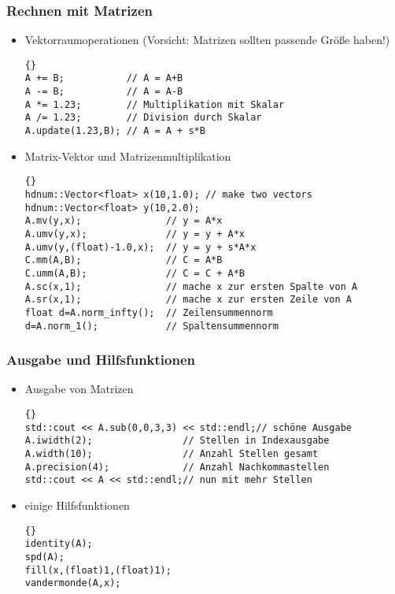 \documentclass[a4paper,11pt]{article}
\theoremstyle{definition}
\begin{document}
\begin{frame}[fragile]
\frametitle{Rechnen mit Matrizen}
\begin{itemize}
\item Vektorraumoperationen (Vorsicht: Matrizen sollten passende Größe haben!)\\
{\footnotesize{\begin{lstlisting}{}
A += B;           // A = A+B
A -= B;           // A = A-B
A *= 1.23;        // Multiplikation mit Skalar
A /= 1.23;        // Division durch Skalar
A.update(1.23,B); // A = A + s*B
\end{lstlisting}}}
\item Matrix-Vektor und Matrizenmultiplikation\\
{\footnotesize{\begin{lstlisting}{}
hdnum::Vector<float> x(10,1.0); // make two vectors
hdnum::Vector<float> y(10,2.0);
A.mv(y,x);               // y = A*x
A.umv(y,x);              // y = y + A*x
A.umv(y,(float)-1.0,x);  // y = y + s*A*x
C.mm(A,B);               // C = A*B
C.umm(A,B);              // C = C + A*B
A.sc(x,1);               // mache x zur ersten Spalte von A
A.sr(x,1);               // mache x zur ersten Zeile von A
float d=A.norm_infty();  // Zeilensummennorm
d=A.norm_1();            // Spaltensummennorm
\end{lstlisting}}}
\end{itemize}
\end{frame}

\begin{frame}[fragile]
\frametitle{Ausgabe und Hilfsfunktionen}
\begin{itemize}
\item Ausgabe von Matrizen\\
{\footnotesize{\begin{lstlisting}{}
std::cout << A.sub(0,0,3,3) << std::endl;// schöne Ausgabe
A.iwidth(2);                // Stellen in Indexausgabe
A.width(10);                // Anzahl Stellen gesamt
A.precision(4);             // Anzahl Nachkommastellen
std::cout << A << std::endl;// nun mit mehr Stellen
\end{lstlisting}}}
\item einige Hilfsfunktionen
{\footnotesize{\begin{lstlisting}{}
identity(A);
spd(A);
fill(x,(float)1,(float)1);
vandermonde(A,x);
\end{lstlisting}}}
\end{itemize}
\end{frame}
\end{document}
